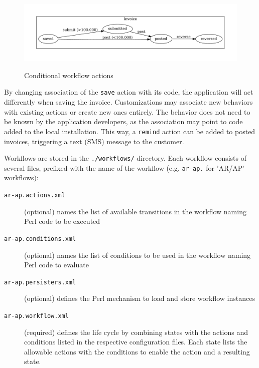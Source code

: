 \begin{figure}[H]
\centering
\ifpdf
	 {} {
	}
\fi
\includegraphics[width=\graphicswidth]{wf2.pdf}
\caption{Conditional workflow actions}
\label{fig:conditional-workflows}
\end{figure}

By changing association of the \texttt{save} action with its code, the application will act
differently when saving the invoice.  Customizations may associate new behaviors with existing
actions or create new ones entirely.  The behavior does not need to be known by the application
developers, as the association may point to code added to the local installation.  This way, a
\texttt{remind} action can be added to posted invoices, triggering a text (SMS) message to the
customer.


Workflows are stored in the \texttt{./workflows/} directory.  Each workflow consists of
several files, prefixed with the name of the workflow (e.g. \texttt{ar-ap.} for 'AR/AP' workflows):

\begin{description}
	\item [\texttt{ar-ap.actions.xml}] (optional) names the list of available transitions
	in the workflow naming Perl code to be executed
	\item [\texttt{ar-ap.conditions.xml}] (optional) names the list of conditions to be used
	in the workflow naming Perl code to evaluate
	\item [\texttt{ar-ap.persisters.xml}] (optional) defines the Perl mechanism to load and store
	workflow instances
	\item [\texttt{ar-ap.workflow.xml}] (required) defines the life cycle by combining states with
	the actions and conditions listed in the respective configuration files. Each state lists
	the allowable actions with the conditions to enable the action and a resulting state.
\end{description}

